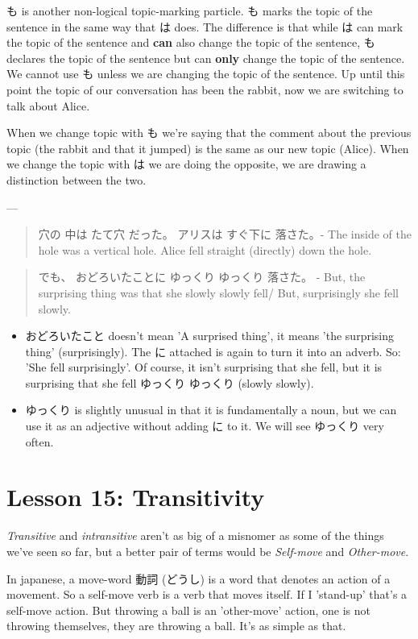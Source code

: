 \documentclass[11pt]{article}
\begin{document}
も is another non-logical topic-marking particle. も marks the topic of the sentence in the same way that は does. The difference is that while は can mark the topic of the sentence and \textbf{can} also change the topic of the sentence, も declares the topic of the sentence but can \textbf{only} change the topic of the sentence. We cannot use も unless we are changing the topic of the sentence. Up until this point the topic of our conversation has been the rabbit, now we are switching to talk about Alice.

When we change topic with も we're saying that the comment about the previous topic (the rabbit and that it jumped) is the same as our new topic (Alice). When we change the topic with は we are doing the opposite, we are drawing a distinction between the two.

---

\begin{quote}
穴の 中は たて穴 だった。 アリスは すぐ下に 落さた。- The inside of the hole was a vertical hole. Alice fell straight (directly) down the hole.
\end{quote}

\begin{quote}
でも、 おどろいたことに ゆっくり ゆっくり 落さた。 - But, the surprising thing was that she slowly slowly fell/ But, surprisingly she fell slowly.
\end{quote}
\begin{itemize}
\item おどろいたこと doesn't mean 'A surprised thing', it means 'the surprising thing' (surprisingly). The に attached is again to turn it into an adverb. So: 'She fell surprisingly'. Of course, it isn't surprising that she fell, but it is surprising that she fell ゆっくり ゆっくり (slowly slowly).
\item ゆっくり is slightly unusual in that it is fundamentally a noun, but we can use it as an adjective without adding に to it. We will see ゆっくり very often.
\end{itemize}

\section{Lesson 15: Transitivity}
\label{sec:org65ae60f}
\emph{Transitive} and \emph{intransitive} aren't as big of a misnomer as some of the things we've seen so far, but a better pair of terms would be \emph{Self-move} and \emph{Other-move}.

In japanese, a move-word 動詞 (どうし) is a word that denotes an action of a movement. So a self-move verb is a verb that moves itself. If I 'stand-up' that's a self-move action. But throwing a ball is an 'other-move' action, one is not throwing themselves, they are throwing a ball. It's as simple as that.
\end{document}

